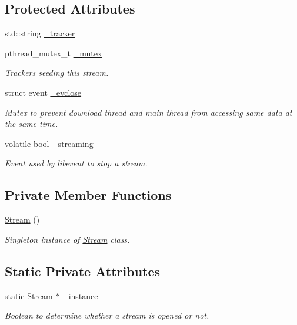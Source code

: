 \subsection*{Protected Attributes}
\begin{DoxyCompactItemize}
\item 
std::string \hyperlink{classStream_a2ec1ba083e298533762f00893bf23dee}{\_\-tracker}
\item 
pthread\_\-mutex\_\-t \hyperlink{classStream_aea6eb94dcf571723cb7ca9a82b1f3231}{\_\-mutex}
\begin{DoxyCompactList}\small\item\em Trackers seeding this stream. \end{DoxyCompactList}\item 
struct event \hyperlink{classStream_a764ba55d950220d7c4af19ae7a84ae96}{\_\-evclose}
\begin{DoxyCompactList}\small\item\em Mutex to prevent download thread and main thread from accessing same data at the same time. \end{DoxyCompactList}\item 
volatile bool \hyperlink{classStream_ac10bae4ebf1a1def9f8d8befa71a0bac}{\_\-streaming}
\begin{DoxyCompactList}\small\item\em Event used by libevent to stop a stream. \end{DoxyCompactList}\end{DoxyCompactItemize}
\subsection*{Private Member Functions}
\begin{DoxyCompactItemize}
\item 
\hyperlink{classStream_a8c3f05bd00361ec92627fa41f330a39b}{Stream} ()
\begin{DoxyCompactList}\small\item\em Singleton instance of \hyperlink{classStream}{Stream} class. \end{DoxyCompactList}\end{DoxyCompactItemize}
\subsection*{Static Private Attributes}
\begin{DoxyCompactItemize}
\item 
static \hyperlink{classStream}{Stream} $\ast$ \hyperlink{classStream_a504127347f6ada557e77642a8512a790}{\_\-instance}
\begin{DoxyCompactList}\small\item\em Boolean to determine whether a stream is opened or not. \end{DoxyCompactList}\end{DoxyCompactItemize}


